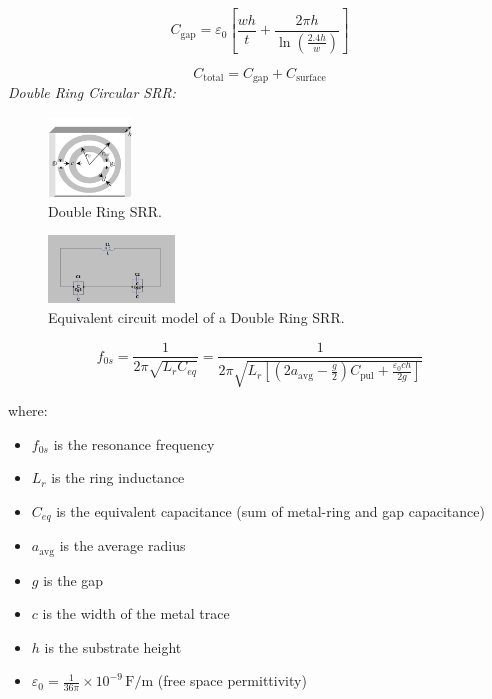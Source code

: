 \documentclass[conference]{IEEEtran}
\begin{document}
    \begin{equation}
    C_{\text{gap}} = \varepsilon_0 \left[ \frac{wh}{t} + \frac{2\pi h}{\ln\left( \frac{2.4h}{w} \right)} \right]
    \end{equation}
    
    \begin{equation}
    C_{\text{total}} = C_{\text{gap}} + C_{\text{surface}}
    \end{equation}
\textit{Double Ring Circular SRR:}
\begin{figure}
\centering
    \includegraphics[width=0.2\textwidth]{Images/Double_Ring_SRR.png}
    \caption{Double Ring SRR.}
\end{figure}

\begin{figure}
\centering
    \includegraphics[width=0.3\textwidth]{Images/Double_Circular_Equivalent_modle.png}
    \caption{Equivalent circuit model of a Double Ring SRR.}
\end{figure}
\begin{equation}
    f_{0s} = \frac{1}{2\pi \sqrt{L_r C_{eq}}} 
    = \frac{1}{2\pi \sqrt{L_r \left[ \left(2a_{\text{avg}} - \frac{g}{2} \right) C_{\text{pul}} + \frac{\varepsilon_0 c h}{2g} \right] }}
    \end{equation}
    
    \noindent
    where:
    \begin{itemize}
        \item \( f_{0s} \) is the resonance frequency
        \item \( L_r \) is the ring inductance
        \item \( C_{eq} \) is the equivalent capacitance (sum of metal-ring and gap capacitance)
        \item \( a_{\text{avg}} \) is the average radius
        \item \( g \) is the gap
        \item \( c \) is the width of the metal trace
        \item \( h \) is the substrate height
        \item \( \varepsilon_0 = \frac{1}{36\pi} \times 10^{-9} \, \text{F/m} \) (free space permittivity)
    \end{itemize}
    
\end{document}
